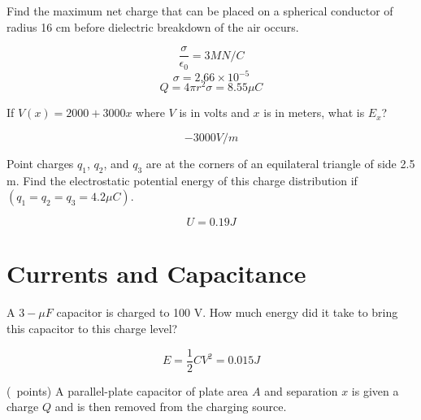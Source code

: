 \begin{questions}

  \question[3] Find the maximum net charge that can be placed on a
  spherical conductor of radius 16 cm before dielectric breakdown of
  the air occurs.

  \begin{solution}
    $$\frac{\sigma}{\epsilon_0} = 3 MN/C$$
    $$\sigma = 2.66 \times 10^{-5}$$
    $$Q = 4\pi r^2 \sigma = 8.55 \mu C$$
  \end{solution}

  \question[2] If $V(x) = 2000 + 3000x$ where $V$ is in volts and $x$
  is in meters, what is $E_x$?

  \begin{solution}
    $$-3000 V/m$$
  \end{solution}

  \question[2] Point charges $q_1$, $q_2$, and $q_3$ are at the
  corners of an equilateral triangle of side 2.5 m. Find the
  electrostatic potential energy of this charge distribution if $(q_1
  = q_2 = q_3 = 4.2 \mu C)$. 

  \begin{solution}
    $$U = 0.19 J$$
  \end{solution}

  \section{Currents and Capacitance}

  
  \question[3] A $3-\mu F$ capacitor is charged to 100 V. How much
  energy did it take to bring this capacitor to this charge level?

  \begin{solution}
    $$E = \frac{1}{2}C V^2 = 0.015 J$$
  \end{solution}

  \question (\totalpoints\ points) A parallel-plate capacitor of plate
  area $A$ and separation $x$ is given a charge $Q$ and is then
  removed from the charging source. 
\end{questions}
